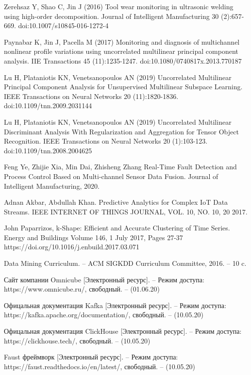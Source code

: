 \begin{thebibliography}{00}
    Zerehsaz Y, Shao C, Jin J (2016) Tool wear monitoring in ultrasonic
    welding using high-order decomposition. Journal of Intelligent
    Manufacturing 30 (2):657-669. doi:10.1007/s10845-016-1272-4

    Paynabar K, Jin J, Pacella M (2017) Monitoring and diagnosis of
    multichannel nonlinear profile variations using uncorrelated multilinear
    principal component analysis. IIE Transactions 45 (11):1235-1247.
    doi:10.1080/0740817x.2013.770187

    Lu H, Plataniotis KN, Venetsanopoulos AN (2019) Uncorrelated
    Multilinear Principal Component Analysis for Unsupervised Multilinear
    Subspace Learning. IEEE Transactions on Neural Networks 20
    (11):1820-1836. doi:10.1109/tnn.2009.2031144

    Lu H, Plataniotis KN, Venetsanopoulos AN (2019) Uncorrelated
    Multilinear Discriminant Analysis With Regularization and Aggregation
    for Tensor Object Recognition. IEEE Transactions on Neural Networks
    20 (1):103-123. doi:10.1109/tnn.2008.2004625

    Feng Ye, Zhijie Xia, Min Dai, Zhisheng Zhang
    Real-Time Fault Detection and Process Control Based
    on Multi-channel Sensor Data Fusion.
    Journal of Intelligent Manufacturing, 2020.

    Adnan Akbar, Abdullah Khan.
    Predictive Analytics for Complex IoT Data Streams.
    IEEE INTERNET OF THINGS JOURNAL, VOL. 10, NO. 10, 20 2017.

    John Paparrizos,
    k-Shape: Efficient and Accurate Clustering of Time Series.
    Energy and Buildings
    Volume 146, 1 July 2017, Pages 27-37
    https://doi.org/10.1016/j.enbuild.2017.03.071


    Data Mining Curriculum.
    -- ACM SIGKDD Curriculum Committee, 2016. -- 10 c.

    Сайт компании Omnicube [Электронный ресурс].
    -- Режим доступа: https://www.omnicube.ru/, свободный. -- (01.06.20)

    Офицальная документация Kafka [Электронный ресурс]. 
    -- Режим доступа: https://kafka.apache.org/documentation/, свободный. -- (10.05.20)

    Офицальная документация ClickHouse [Электронный ресурс]. 
    -- Режим доступа: https://clickhouse.tech/, свободный. -- (10.05.20)
    
    Faust фреймворк [Электронный ресурс]. 
    -- Режим доступа: https://faust.readthedocs.io/en/latest/, свободный. -- (10.05.20)

\end{thebibliography}
\endgroup

\clearpage